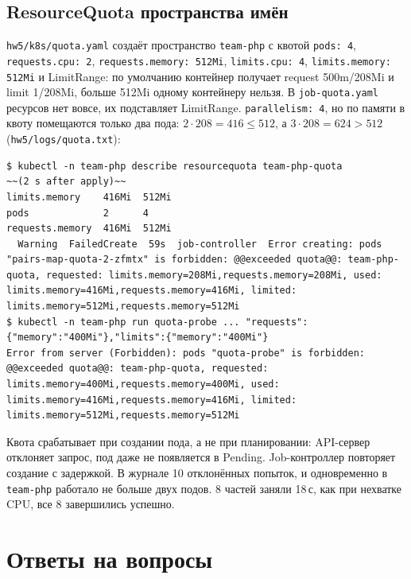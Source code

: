 \documentclass[11pt,a4paper]{article}
\DeclareRobustCommand{\code}[1]{\begingroup\renewcommand{\_}{\textunderscore\allowbreak}\renewcommand{\slash}{/\allowbreak}\texttt{#1}\endgroup}
\newcommand{\logf}[1]{\code{hw5\slash logs\slash #1}}
\begin{document}
\subsection{ResourceQuota пространства имён}
\label{sec:quota}

\code{hw5/k8s/quota.yaml} создаёт пространство \code{team-php} с квотой \code{pods: 4}, \code{requests.cpu: 2}, \code{requests.memory: 512Mi}, \code{limits.cpu: 4}, \code{limits.memory: 512Mi} и LimitRange: по умолчанию контейнер получает request 500m/208Mi и limit 1/208Mi, больше 512Mi одному контейнеру нельзя. В \code{job-quota.yaml} ресурсов нет вовсе, их подставляет LimitRange. \code{parallelism: 4}, но по памяти в квоту помещаются только два пода: $2 \cdot 208 = 416 \le 512$, а $3 \cdot 208 = 624 > 512$ (\logf{11\_quota.txt}):
\begin{lstlisting}
$ kubectl -n team-php describe resourcequota team-php-quota          ~~(2 s after apply)~~
limits.memory    416Mi  512Mi
pods             2      4
requests.memory  416Mi  512Mi
  Warning  FailedCreate  59s  job-controller  Error creating: pods "pairs-map-quota-2-zfmtx" is forbidden: @@exceeded quota@@: team-php-quota, requested: limits.memory=208Mi,requests.memory=208Mi, used: limits.memory=416Mi,requests.memory=416Mi, limited: limits.memory=512Mi,requests.memory=512Mi
$ kubectl -n team-php run quota-probe ... "requests":{"memory":"400Mi"},"limits":{"memory":"400Mi"}
Error from server (Forbidden): pods "quota-probe" is forbidden: @@exceeded quota@@: team-php-quota, requested: limits.memory=400Mi,requests.memory=400Mi, used: limits.memory=416Mi,requests.memory=416Mi, limited: limits.memory=512Mi,requests.memory=512Mi
\end{lstlisting}
Квота срабатывает при создании пода, а не при планировании: API-сервер отклоняет запрос, под даже не появляется в Pending. Job-контроллер повторяет создание с задержкой. В журнале 10 отклонённых попыток, и одновременно в \code{team-php} работало не больше двух подов. 8 частей заняли 18\,с, как при нехватке CPU, все 8 завершились успешно.

\section{Ответы на вопросы}
\end{document}
